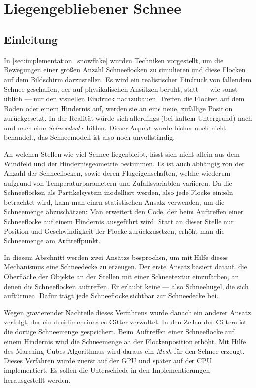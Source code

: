 \section{Liegengebliebener Schnee}
\label{sec:fallen_snow}

\subsection{Einleitung}

In \cref{sec:implementation_snowflake} wurden Techniken
vorgestellt, um die Bewegungen einer großen Anzahl Schneeflocken zu
simulieren und diese Flocken auf dem Bildschirm darzustellen. Es wird
ein realistischer Eindruck von fallendem Schnee geschaffen, der auf
physikalischen Ansätzen beruht, statt --- wie sonst üblich --- nur den
visuellen Eindruck nachzubauen. Treffen die Flocken auf dem Boden oder
einem Hindernis auf, werden sie an eine neue, zufällige Position
zurückgesetzt. In der Realität würde sich allerdings (bei kaltem
Untergrund) nach und nach eine \emph{Schneedecke} bilden. Dieser
Aspekt wurde bisher noch nicht behandelt, das Schneemodell ist also
noch unvollständig.

An welchen Stellen wie viel Schnee liegenbleibt, lässt sich nicht
allein aus dem Windfeld und der Hindernisgeometrie bestimmen. Es ist
auch abhängig von der Anzahl der Schneeflocken, sowie deren
Flugeigenschaften, welche wiederum aufgrund von Temperaturparametern
und Zufallsvariablen variieren. Da die Schneeflocken als
Partikelsystem modelliert werden, also jede Flocke einzeln betrachtet
wird, kann man einen statistischen Ansatz verwenden, um die
Schneemenge abzuschätzen: Man erweitert den Code, der beim Auftreffen
einer Schneeflocke auf einem Hindernis ausgeführt wird. Statt an
dieser Stelle nur Position und Geschwindigkeit der Flocke
zurückzusetzen, erhöht man die Schneemenge am Auftreffpunkt.

In diesem Abschnitt werden zwei Ansätze besprochen, um mit Hilfe
dieses Mechanismus eine Schneedecke zu erzeugen. Der erste Ansatz
basiert darauf, die Oberfläche der Objekte an den Stellen mit einer
Schneetextur einzufärben, an denen die Schneeflocken auftreffen. Er
erlaubt keine  --- also Schneehügel, die
sich auftürmen. Dafür trägt jede Schneeflocke sichtbar zur Schneedecke
bei.

Wegen gravierender Nachteile dieses Verfahrens wurde danach ein
anderer Ansatz verfolgt, der ein dreidimensionales Gitter
verwaltet. In den Zellen des Gitters ist die dortige Schneemenge
gespeichert. Beim Auftreffen einer Schneeflocke auf einem Hindernis
wird die Schneemenge an der Flockenposition erhöht. Mit Hilfe des
Marching Cubes-Algorithmus wird daraus ein \emph{Mesh} für den Schnee
erzeugt. Dieses Verfahren wurde zuerst auf der GPU und später auf der
CPU implementiert. Es sollen die Unterschiede in den Implementierungen
herausgestellt werden.

